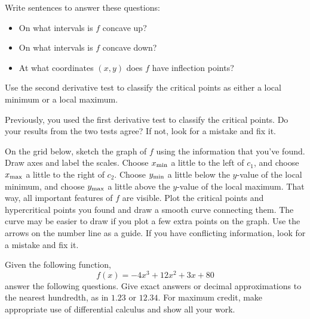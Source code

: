 \begin{ProblemSet}
\begin{Problem}[pencil space=0in]
 \end{Problem}

 \begin{Problem}[pencil space=2.5in]
  Write sentences to answer these questions:
  \begin{itemize}
  \item On what intervals is $f$ concave up?
  \item On what intervals is $f$ concave down?
  \item At what coordinates $(x,y)$ does $f$ have inflection points?
  \end{itemize}
 \end{Problem}

 \begin{Problem}
  Use the second derivative test to classify the critical points as either a local minimum or a local maximum.
 \end{Problem}
 \begin{Problem}[pencil space=0in]
  Previously, you used the first derivative test to classify the critical points.
  Do your results from the two tests agree?
  If not, look for a mistake and fix it.
 \end{Problem}

 \begin{Problem}
  On the grid below, sketch the graph of $f$ using the information that you've found.
  Draw axes and label the scales.
  Choose $x_\mathrm{min}$ a little to the left of $c_1$, and choose $x_\mathrm{max}$ a little to the right of $c_2$.
  Choose $y_\mathrm{min}$ a little below the $y$-value of the local minimum, and choose $y_\mathrm{max}$ a little above the $y$-value of the local maximum.
  That way, all important features of $f$ are visible.
  Plot the critical points and hypercritical points you found and draw a smooth curve connecting them.
  The curve may be easier to draw if you plot a few extra points on the graph.
  Use the arrows on the number line as a guide.
  If you have conflicting information, look for a mistake and fix it.

  \bigskip
  \GraphingGrid

 \end{Problem}
\end{ProblemSet}

\newpage

Given the following function,
\begin{equation*}
 f(x) = -4x^3 + 12x^2 + 3x + 80
\end{equation*}
answer the following questions.
Give exact answers or decimal approximations to the nearest hundredth, as in $1.23$ or $12.34$.
For maximum credit, make appropriate use of differential calculus and show all your work.

